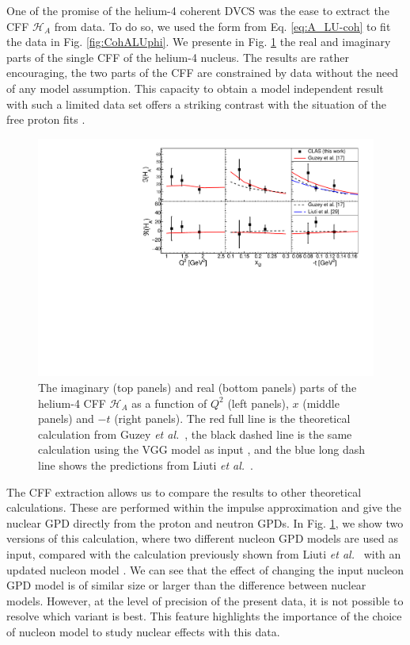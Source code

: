 \documentclass{article}
\begin{document}
One of the promise of the helium-4 coherent DVCS was the ease to extract the CFF $\mathcal{H}_A$ from
data. To do so, we used the form from Eq. \ref{eq:A_LU-coh} to fit the data in Fig. 
\ref{fig:CohALUphi}. We presente in Fig. \ref{fig:CohCFF} the real and imaginary parts 
of the single CFF of the helium-4 nucleus. The results are rather encouraging, the two parts
of the CFF are constrained by data without the need of any model assumption. This capacity to obtain a
model independent result with such a limited data set offers a striking contrast with the
situation of the free proton fits \cite{Dupre:2016mai,Dupre:2017hfs}.

\begin{figure}[tbp!]
\center
\includegraphics[width=14cm]{fig3/Coherent_CFF.pdf}
	\caption{The imaginary (top panels) and real (bottom panels) parts of the helium-4
	CFF $\mathcal{H}_A$ as a function of $Q^2$ (left panels), $x$ (middle panels) and 
	$-t$ (right panels). The red full line is the theoretical calculation from 
	Guzey {\it et al.}~\cite{Guzey:2003jh,Guzey:2008th}, the black dashed line is the same calculation 
	using the VGG model as input \cite{Vanderhaeghen:1999xj,Guidal:2004nd}, and
	the blue long dash line shows the predictions from Liuti {\it et 
	al.}~\cite{Liuti:2005gi,GonzalezHernandez:2012jv}.} 
\label{fig:CohCFF}
\end{figure}

The CFF extraction allows us to compare the results to other theoretical calculations.
These are performed within the impulse approximation \cite{Guzey:2003jh,Guzey:2008th} 
and give the nuclear GPD directly from the proton and neutron GPDs. In 
Fig. \ref{fig:CohCFF}, we show two versions of this calculation, where two different nucleon GPD
models are used as input, compared with the calculation previously shown from Liuti 
{\it et al.}~\cite{Liuti:2005gi} with an updated nucleon model \cite{GonzalezHernandez:2012jv}.
We can see that the effect of changing the input nucleon GPD model
is of similar size or larger than the difference between nuclear 
models. However, at the level of precision of the present data,
it is not possible to resolve which variant is best. This feature highlights the 
importance of the choice of nucleon model to study nuclear effects with this data.
\end{document}
